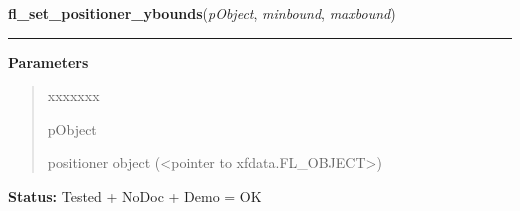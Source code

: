 \hspace{.8\funcindent}\begin{boxedminipage}{\funcwidth}

    \raggedright \textbf{fl\_set\_positioner\_ybounds}(\textit{pObject}, \textit{minbound}, \textit{maxbound})

    \vspace{-1.5ex}

    \rule{\textwidth}{0.5\fboxrule}
\setlength{\parskip}{2ex}
\setlength{\parskip}{1ex}
      \textbf{Parameters}
      \vspace{-1ex}

      \begin{quote}
        \begin{Ventry}{xxxxxxx}

          \item[pObject]

          positioner object ({\textless}pointer to 
          xfdata.FL\_OBJECT{\textgreater})

        \end{Ventry}

      \end{quote}

\textbf{Status:} Tested + NoDoc + Demo = OK



    \end{boxedminipage}

    \label{xformslib:library:fl_get_positioner_ybounds}

    \vspace{0.5ex}

